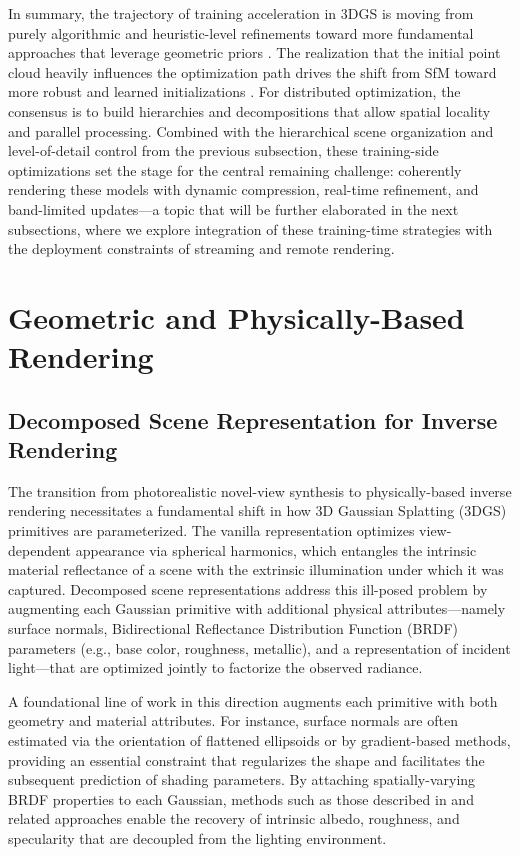 \documentclass[11pt,a4paper]{article}
\begin{document}
In summary, the trajectory of training acceleration in 3DGS is moving from purely algorithmic and heuristic-level refinements toward more fundamental approaches that leverage geometric priors \cite{arxiv:2402.14650v1}. The realization that the initial point cloud heavily influences the optimization path drives the shift from SfM toward more robust and learned initializations \cite{arxiv:2403.09413v1}. For distributed optimization, the consensus is to build hierarchies and decompositions that allow spatial locality and parallel processing. Combined with the hierarchical scene organization and level-of-detail control from the previous subsection, these training-side optimizations set the stage for the central remaining challenge: coherently rendering these models with dynamic compression, real-time refinement, and band-limited updates---a topic that will be further elaborated in the next subsections, where we explore integration of these training-time strategies with the deployment constraints of streaming and remote rendering.


\section{Geometric and Physically-Based Rendering}



\subsection{Decomposed Scene Representation for Inverse Rendering}


The transition from photorealistic novel-view synthesis to physically-based inverse rendering necessitates a fundamental shift in how 3D Gaussian Splatting (3DGS) primitives are parameterized. The vanilla representation \cite{arxiv:2308.04079v1} optimizes view-dependent appearance via spherical harmonics, which entangles the intrinsic material reflectance of a scene with the extrinsic illumination under which it was captured. Decomposed scene representations address this ill-posed problem by augmenting each Gaussian primitive with additional physical attributes---namely surface normals, Bidirectional Reflectance Distribution Function (BRDF) parameters (e.g., base color, roughness, metallic), and a representation of incident light---that are optimized jointly to factorize the observed radiance.

A foundational line of work in this direction augments each primitive with both geometry and material attributes. For instance, surface normals are often estimated via the orientation of flattened ellipsoids or by gradient-based methods, providing an essential constraint that regularizes the shape and facilitates the subsequent prediction of shading parameters. By attaching spatially-varying BRDF properties to each Gaussian, methods such as those described in \cite{arxiv:2111.12503v5} and related approaches \cite{arxiv:2311.12775v3} enable the recovery of intrinsic albedo, roughness, and specularity that are decoupled from the lighting environment.
\end{document}
